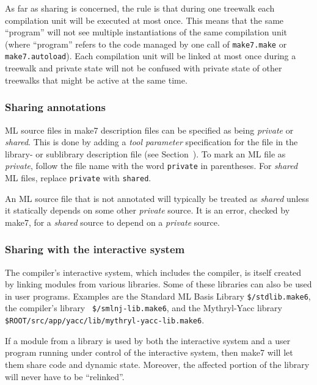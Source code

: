 As far as sharing is concerned, the rule is that during one treewalk
each compilation unit will be executed at most once.  This means that
the same ``program'' will not see multiple instantiations of the same
compilation unit (where ``program'' refers to the code managed by one
call of {\tt make7.make} or {\tt make7.autoload}).  Each compilation unit
will be linked at most once during a treewalk and private state
will not be confused with private state of other treewalks that might
be active at the same time.


\subsubsection{Sharing annotations}

ML source files in make7 description files can be specified as being {\em
private} or {\em shared}.  This is done by adding a {\em tool
parameter} specification for the file in the library- or sublibrary
description file (see Section~). To mark an ML file
as {\em private}, follow the file name with the word {\tt private} in
parentheses.  For {\em shared} ML files, replace {\tt private} with
{\tt shared}.

An ML source file that is not annotated will typically be treated as
{\em shared} unless it statically depends on some other {\em private}
source.  It is an error, checked by make7, for a {\em shared} source to
depend on a {\em private} source.

\subsubsection{Sharing with the interactive system}

The compiler's interactive system, which includes the compiler, is itself
created by linking modules from various libraries. Some of these
libraries can also be used in user programs.  Examples are the
Standard ML Basis Library {\tt \$/stdlib.make6}, the compiler's library {\tt
\$/smlnj-lib.make6}, and the Mythryl-Yacc library {\tt \$ROOT/src/app/yacc/lib/mythryl-yacc-lib.make6}.

If a module from a library is used by both the interactive system and
a user program running under control of the interactive system, then
make7 will let them share code and dynamic state.  Moreover, the affected
portion of the library will never have to be ``relinked''.
